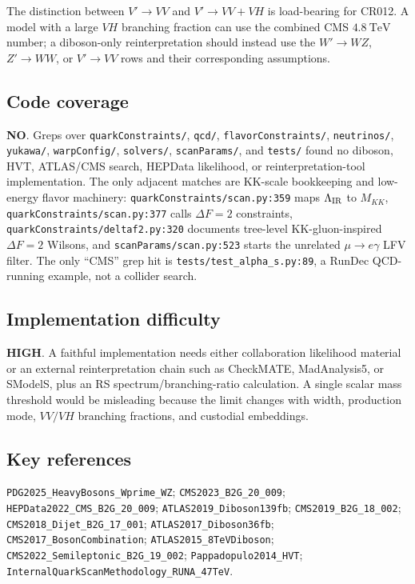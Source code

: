 The distinction between \(V'\to VV\) and \(V'\to VV+VH\) is load-bearing for
CR012.  A model with a large \(VH\) branching fraction can use the combined CMS
\(4.8~\mathrm{TeV}\) number; a diboson-only reinterpretation should instead use
the \(W'\to WZ\), \(Z'\to WW\), or \(V'\to VV\) rows and their corresponding
assumptions.

\subsection*{Code coverage}
\textbf{NO}.  Greps over \texttt{quarkConstraints/}, \texttt{qcd/},
\texttt{flavorConstraints/}, \texttt{neutrinos/}, \texttt{yukawa/},
\texttt{warpConfig/}, \texttt{solvers/}, \texttt{scanParams/}, and
\texttt{tests/} found no diboson, HVT, ATLAS/CMS search, HEPData likelihood, or
reinterpretation-tool implementation.  The only adjacent matches are KK-scale
bookkeeping and low-energy flavor machinery: \texttt{quarkConstraints/scan.py:359}
maps \(\Lambda_{\rm IR}\) to \(M_{KK}\), \texttt{quarkConstraints/scan.py:377}
calls \(\Delta F=2\) constraints, \texttt{quarkConstraints/deltaf2.py:320}
documents tree-level KK-gluon-inspired \(\Delta F=2\) Wilsons, and
\texttt{scanParams/scan.py:523} starts the unrelated \(\mu\to e\gamma\) LFV
filter.  The only ``CMS'' grep hit is \texttt{tests/test\_alpha\_s.py:89}, a
RunDec QCD-running example, not a collider search.

\subsection*{Implementation difficulty}
\textbf{HIGH}.  A faithful implementation needs either collaboration likelihood
material or an external reinterpretation chain such as CheckMATE, MadAnalysis5,
or SModelS, plus an RS spectrum/branching-ratio calculation.  A single scalar
mass threshold would be misleading because the limit changes with width,
production mode, \(VV/VH\) branching fractions, and custodial embeddings.

\subsection*{Key references}
\texttt{PDG2025\_HeavyBosons\_Wprime\_WZ};
\texttt{CMS2023\_B2G\_20\_009};
\texttt{HEPData2022\_CMS\_B2G\_20\_009};
\texttt{ATLAS2019\_Diboson139fb};
\texttt{CMS2019\_B2G\_18\_002};
\texttt{CMS2018\_Dijet\_B2G\_17\_001};
\texttt{ATLAS2017\_Diboson36fb};
\texttt{CMS2017\_BosonCombination};
\texttt{ATLAS2015\_8TeVDiboson};
\texttt{CMS2022\_Semileptonic\_B2G\_19\_002};
\texttt{Pappadopulo2014\_HVT};
\texttt{InternalQuarkScanMethodology\_RUNA\_47TeV}.
